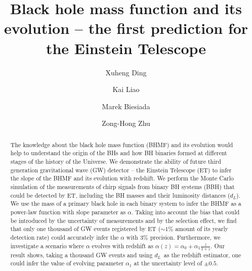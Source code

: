 \documentclass[twocolumn]{aastex62}
\begin{document}
\newcommand{\mbh}{$\mathcal M_{\rm BH}$}
\newcommand{\cmass}{${\cal M}_0$}
\newcommand{\dl}{$d_L$}
\newcommand{\mone}{$m_1$}
\newcommand{\mtwo}{$m_2$}
\newcommand{\snr}{$\rho$}

\title{Black hole mass function and its evolution -- the first prediction for the Einstein Telescope}


\author%
{Xuheng Ding}


\author%
{Kai Liao}

\author%
{Marek Biesiada}

\author%
{Zong-Hong Zhu}


\begin{abstract}
The knowledge about the  black hole mass function (BHMF) and its evolution would help to understand the origin of the BHs and how BH binaries formed at different stages of the history of the Universe. We demonstrate the ability of future third generation gravitational wave (GW) detector -- the Einstein Telescope (ET) to infer the slope of the BHMF and its evolution with redshift.  We perform the Monte Carlo simulation of the measurements of chirp signals from binary BH systems (BBH) that could be detected by ET, including the BH masses and their luminosity distances (\dl). We use the mass of a primary black hole in each binary system to infer the BHMF as a power-law function with slope parameter as $\alpha$. Taking into account the bias that could be introduced by the uncertainty of measurements and by the selection effect, we find that only one thousand of GW events registered by ET ($\sim1\%$ amount of its yearly detection rate) could accurately infer the $\alpha$ with $3\%$ precision. Furthermore, we investigate a scenario where $\alpha$ evolves with redshift as $\alpha(z) = \alpha_0 + \alpha_1\frac{z}{1+z}$. Our result shows, taking a thousand GW events and using \dl\ as the redshift estimator, one could infer the value of evolving parameter $\alpha_1$ at the uncertainty level of $\pm0.5$.
\end{abstract}
\end{document}
